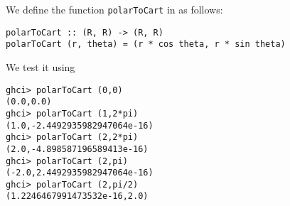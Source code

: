 
We define the function \verb|polarToCart| in  as follows:

\begin{verbatim}
polarToCart :: (R, R) -> (R, R)
polarToCart (r, theta) = (r * cos theta, r * sin theta)
\end{verbatim}

We test it using
\begin{verbatim}
ghci> polarToCart (0,0)
(0.0,0.0)
ghci> polarToCart (1,2*pi)
(1.0,-2.4492935982947064e-16)
ghci> polarToCart (2,2*pi)
(2.0,-4.898587196589413e-16)
ghci> polarToCart (2,pi)
(-2.0,2.4492935982947064e-16)
ghci> polarToCart (2,pi/2)
(1.2246467991473532e-16,2.0)
\end{verbatim}
